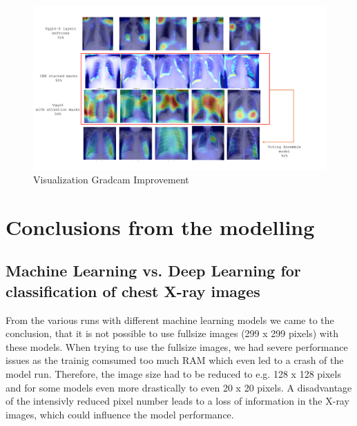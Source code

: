 \documentclass{article}
\begin{document}
\begin{figure}%
    \centering
    \includegraphics[width=1.0\linewidth]{figures_report_3/gradcam_final.png}
    \caption{Visualization Gradcam Improvement}
    \label{fig:Visualization of Gradcam}
\end{figure}




\section{Conclusions from the modelling}



\subsection{Machine Learning vs. Deep Learning for classification of chest X-ray images}

From the various runs with different machine learning models we came to the conclusion, that it is not possible to use fullsize images (299 x 299 pixels) with these models. 
When trying to use the fullsize images, we had severe performance issues as the trainig comsumed too much RAM which even led to a crash of the model run. Therefore, the image size had to be reduced to e.g. 128 x 128 pixels and for some models even more drastically to even 20 x 20 pixels. A disadvantage of the intensivly reduced pixel number leads to a loss of information in the X-ray images, which could influence the model performance. 
\end{document}
